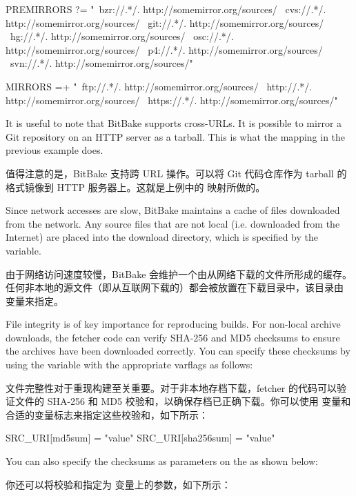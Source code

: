 \begin{pyglist}
PREMIRRORS ?= "\
   bzr://.*/.\*  http://somemirror.org/sources/ \
   cvs://.*/.\*  http://somemirror.org/sources/ \
   git://.*/.\*  http://somemirror.org/sources/ \
   hg://.*/.\*   http://somemirror.org/sources/ \
   osc://.*/.\*  http://somemirror.org/sources/ \
   p4://.*/.\*   http://somemirror.org/sources/ \
  svn://.*/.\*   http://somemirror.org/sources/"

MIRRORS =+ "\
   ftp://.*/.\*   http://somemirror.org/sources/ \
   http://.*/.\*  http://somemirror.org/sources/ \
   https://.*/.\* http://somemirror.org/sources/"
\end{pyglist}

It is useful to note that BitBake supports cross-URLs. It is possible to mirror a Git repository on an HTTP server as a tarball. This is what the  mapping in the previous example does.

值得注意的是，BitBake 支持跨 URL 操作。可以将 Git 代码仓库作为 tarball 的格式镜像到 HTTP 服务器上。这就是上例中的  映射所做的。

Since network accesses are slow, BitBake maintains a cache of files downloaded from the network. Any source files that are not local (i.e. downloaded from the Internet) are placed into the download directory, which is specified by the  variable.

由于网络访问速度较慢，BitBake 会维护一个由从网络下载的文件所形成的缓存。任何非本地的源文件（即从互联网下载的）都会被放置在下载目录中，该目录由  变量来指定。

File integrity is of key importance for reproducing builds. For non-local archive downloads, the fetcher code can verify SHA-256 and MD5 checksums to ensure the archives have been downloaded correctly. You can specify these checksums by using the  variable with the appropriate varflags as follows:

文件完整性对于重现构建至关重要。对于非本地存档下载，fetcher 的代码可以验证文件的 SHA-256 和 MD5 校验和，以确保存档已正确下载。你可以使用 \bbgls{SRC_URI} 变量和合适的变量标志来指定这些校验和，如下所示：

\begin{pyglist}
SRC_URI[md5sum] = "value"
SRC_URI[sha256sum] = "value"
\end{pyglist}

You can also specify the checksums as parameters on the  as shown below:

你还可以将校验和指定为  变量上的参数，如下所示：

